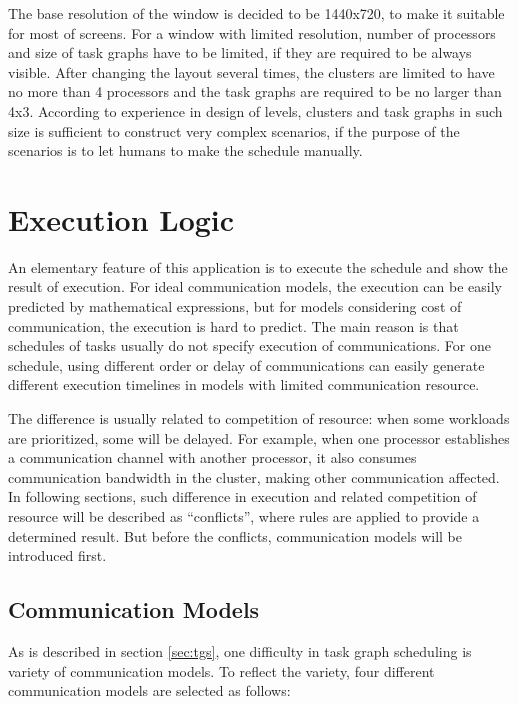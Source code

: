 \documentclass[msc,deptreport, cs]{infthesis}
\begin{document}
The base resolution of the window is decided to be 1440x720, to make it suitable for most of screens. For a window with limited resolution, number of processors and size of task graphs have to be limited, if they are required to be always visible. After changing the layout several times, the clusters are limited to have no more than 4 processors and the task graphs are required to be no larger than 4x3. According to experience in design of levels, clusters and task graphs in such size is sufficient to construct very complex scenarios, if the purpose of the scenarios is to let humans to make the schedule manually.

\section{Execution Logic} \label{sec:execution}

An elementary feature of this application is to execute the schedule and show the result of execution. For ideal communication models, the execution can be easily predicted by mathematical expressions, but for models considering cost of communication, the execution is hard to predict. The main reason is that schedules of tasks usually do not specify execution of communications. For one schedule, using different order or delay of communications can easily generate different execution timelines in models with limited communication resource. 

The difference is usually related to competition of resource: when some workloads are prioritized, some will be delayed. For example, when one processor establishes a communication channel with another processor, it also consumes communication bandwidth in the cluster, making other communication affected. In following sections, such difference in execution and related competition of resource will be described as ``conflicts'', where rules are applied to provide a determined result. But before the conflicts, communication models will be introduced first.

\subsection{Communication Models} \label{sec:comm}

As is described in section \ref{sec:tgs}, one difficulty in task graph scheduling is variety of communication models. To reflect the variety, four different communication models are selected as follows:
\end{document}
